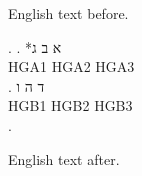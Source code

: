 
English text before.

\begin{hebrew}
\ex. \ag. *א ב ג\\ HGA1 HGA2 HGA3\\
\bg. ד ה ו\\ HGB1 HGB2 HGB3\\
\z.
\end{hebrew}

English text after.

